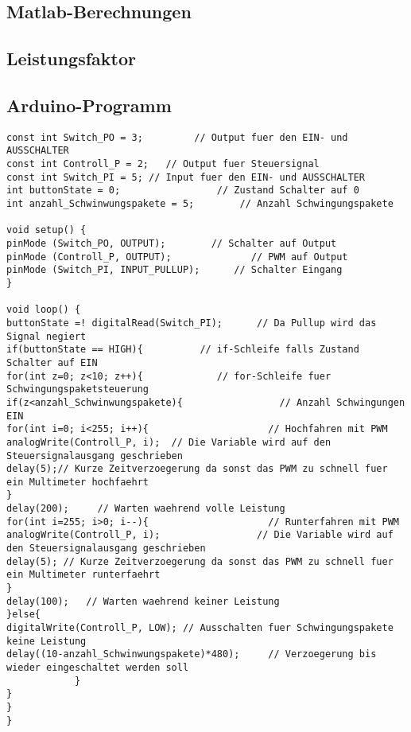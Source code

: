 \begin{appendix} %
\section{Matlab-Berechnungen}
\subsection{Leistungsfaktor}


\newpage
\subsection{Arduino-Programm}
\begin{lstlisting}[language=Arduino]
const int Switch_PO = 3;         // Output fuer den EIN- und AUSSCHALTER
const int Controll_P = 2;   // Output fuer Steuersignal
const int Switch_PI = 5; // Input fuer den EIN- und AUSSCHALTER
int buttonState = 0;                 // Zustand Schalter auf 0
int anzahl_Schwinwungspakete = 5;        // Anzahl Schwingungspakete

void setup() {
pinMode (Switch_PO, OUTPUT);        // Schalter auf Output
pinMode (Controll_P, OUTPUT);              // PWM auf Output
pinMode (Switch_PI, INPUT_PULLUP);      // Schalter Eingang
}

void loop() {
buttonState =! digitalRead(Switch_PI);      // Da Pullup wird das Signal negiert
if(buttonState == HIGH){          // if-Schleife falls Zustand Schalter auf EIN
for(int z=0; z<10; z++){             // for-Schleife fuer Schwingungspaketsteuerung
if(z<anzahl_Schwinwungspakete){                 // Anzahl Schwingungen EIN
for(int i=0; i<255; i++){                     // Hochfahren mit PWM
analogWrite(Controll_P, i);  // Die Variable wird auf den Steuersignalausgang geschrieben
delay(5);// Kurze Zeitverzoegerung da sonst das PWM zu schnell fuer ein Multimeter hochfaehrt       
}
delay(200);     // Warten waehrend volle Leistung
for(int i=255; i>0; i--){                     // Runterfahren mit PWM
analogWrite(Controll_P, i);                 // Die Variable wird auf den Steuersignalausgang geschrieben
delay(5); // Kurze Zeitverzoegerung da sonst das PWM zu schnell fuer ein Multimeter runterfaehrt
}
delay(100);   // Warten waehrend keiner Leistung
}else{
digitalWrite(Controll_P, LOW); // Ausschalten fuer Schwingungspakete keine Leistung
delay((10-anzahl_Schwinwungspakete)*480);     // Verzoegerung bis wieder eingeschaltet werden soll
			}
}
}
}






\end{lstlisting}
\end{appendix}
